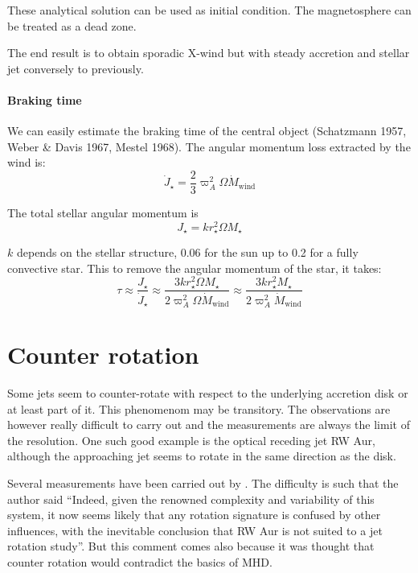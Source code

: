 \documentclass[10pt,a4paper,english]{article}
\begin{document}

These analytical solution can be used as initial condition. The magnetosphere
can be treated as a dead zone.


The end result is to obtain sporadic X-wind but with steady accretion and
stellar jet conversely to previously.

\paragraph{Braking time}

We can easily estimate the braking time of the central object (Schatzmann 1957,
Weber \& Davis 1967, Mestel 1968). The angular momentum loss extracted by the
wind is:
\begin{equation}
    \dot{J}_\star = \frac{2}{3}\varpi_A^2\Omega \dot{M}_\mathrm{wind}
\end{equation}

The total stellar angular momentum is
\begin{equation}
    J_\star = kr^2_\star \Omega M_\star
\end{equation}

$k$ depends on the stellar structure, \num{0.06} for the sun up to \num{0.2}
for a fully convective star. This to remove the angular momentum of the star,
it takes:
\begin{equation}
    \tau \approx \frac{J_\star}{\dot{J}_\star} \approx \frac{3kr^2_\star \Omega M_\star}{2\varpi_A^2\Omega\dot{M}_\mathrm{wind}} \approx \frac{3 kr_\star^2 M_\star}{2\varpi_A^2\dot{M}_\mathrm{wind}}
\end{equation}

\section{Counter rotation}

\label{sec:counter_rotation}

Some jets seem to counter-rotate with respect to the underlying accretion disk
or at least part of it. This phenomenom may be transitory. The observations are
however really difficult to carry out and the measurements are always the limit
of the resolution. One such good example is the optical receding jet RW Aur,
although the approaching jet seems to rotate in the same direction as the disk.

Several measurements have been carried out by \cite{2012ApJ...749..139C}. The
difficulty is such that the author said ``Indeed, given the renowned complexity
and variability of this system, it now seems likely that any rotation signature
is confused by other influences, with the inevitable conclusion that RW Aur is
not suited to a jet rotation study''. But this comment comes also because it
was thought that counter rotation would contradict the basics of MHD.
\end{document}
